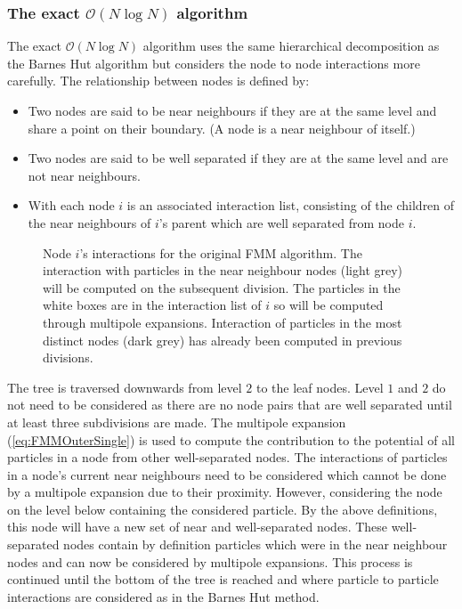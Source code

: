 \subsubsection{\texorpdfstring{The exact $\mathcal{O}(N\log N)$ algorithm}{The exact O(N log N) algorithm}} \label{subsec:ExactNlogN}
The exact $\mathcal{O}(N\log N)$ algorithm uses the same hierarchical decomposition as the Barnes Hut algorithm but considers the node to node interactions more carefully. The relationship between nodes is defined by:
\begin{itemize}
    \item Two nodes are said to be near neighbours if they are at the same level and share a point on their boundary. (A node is a near neighbour of itself.)
    \item Two nodes are said to be well separated if they are at the same level and are not near neighbours.
    \item With each node $i$ is an associated interaction list, consisting of the children of the near neighbours of $i$’s parent which are well separated from node $i$.
\end{itemize}

\begin{figure}
    \centering
        \resizebox{.4\linewidth}{!}{}
    \caption[Node $i$'s interactions for the original FMM algorithm.]{Node $i$'s interactions for the original FMM algorithm. The interaction with particles in the near neighbour nodes (light grey) will be computed on the subsequent division. The particles in the white boxes are in the interaction list of $i$ so will be computed through multipole expansions. Interaction of particles in the most distinct nodes (dark grey) has already been computed in previous divisions.}
    \label{fig:FMMDecomp}
\end{figure}

The tree is traversed downwards from level $2$ to the leaf nodes. Level $1$ and $2$ do not need to be considered as there are no node pairs that are well separated until at least three subdivisions are made. The multipole expansion (\cref{eq:FMMOuterSingle}) is used to compute the contribution to the potential of all particles in a node from other well-separated nodes. The interactions of particles in a node's current near neighbours need to be considered which cannot be done by a multipole expansion due to their proximity. However, considering the node on the level below containing the considered particle. By the above definitions, this node will have a new set of near and well-separated nodes. These well-separated nodes contain by definition particles which were in the near neighbour nodes and can now be considered by multipole expansions. This process is continued until the bottom of the tree is reached and where particle to particle interactions are considered as in the Barnes Hut method. 

